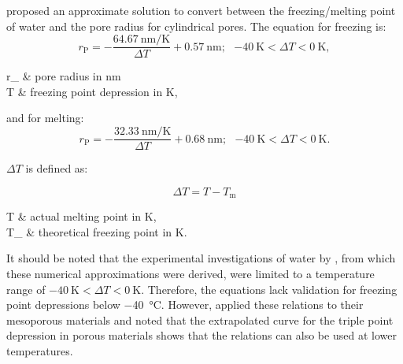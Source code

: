 \textcite{brun.1977} proposed an approximate solution to convert between the freezing/melting point of water and the pore radius for cylindrical pores. %
The equation for freezing is:
\begin{equation}
	r_\text{P} = -\frac{\qty{64.67}{\nano\meter\per\kelvin}}{\Delta T }+\qty{0.57}{\nano\meter};~~~\qty{-40}{\kelvin} < \Delta T < \qty{0}{\kelvin},
	\label{eq:brun_freeze}
\end{equation}
\begin{conditions}
	r_ & pore radius in \unit{\nano\meter}\\
	\Delta T  &  freezing point depression in \unit{\kelvin},
\end{conditions}

and for melting:
\begin{equation}
	r_\text{P} = -\frac{\qty{32.33}{\nano\meter\per\kelvin}}{\Delta T }+\qty{0.68}{\nano\meter};~~~\qty{-40}{\kelvin} < \Delta T < \qty{0}{\kelvin}.
	\label{eq:brun_melt}
\end{equation}

$\Delta T$ is defined as:

\begin{equation}
	\Delta T = T - T_\text{m}
	\label{eq:brun_dT}
\end{equation}
\begin{conditions}
	T          &   actual melting point in \unit{\kelvin}, \\
	T_ &   theoretical freezing point in \unit{\kelvin}.
\end{conditions}

It should be noted that the experimental investigations of water by \textcite{brun.1977}, from which these numerical approximations were derived, were limited to a temperature range of $\qty{-40}{\kelvin} < \Delta T < \qty{0}{\kelvin}$.
Therefore, the equations lack validation for freezing point depressions below \qty{-40}{\celsius}.
However, \textcite{kloetstra.1995} applied these relations to their mesoporous materials and noted that the extrapolated curve for the triple point depression in porous materials shows that the relations can also be used at lower temperatures.

